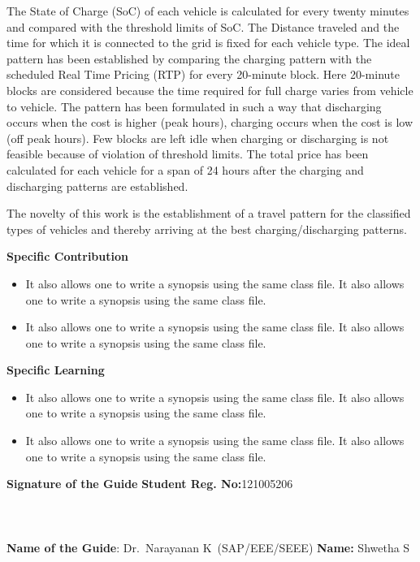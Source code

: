 \documentclass[a4paper, 12pt, oneside]{sastra}
\begin{document}
	The State of Charge (SoC) of each vehicle is calculated for every twenty minutes and compared with the threshold limits of SoC. The Distance traveled and the time for which it is connected to the grid is fixed for each vehicle type. The ideal pattern has been established by comparing the charging pattern with the scheduled Real Time Pricing (RTP) for every 20-minute block. Here 20-minute blocks are considered because the time required for full charge varies from vehicle to vehicle. The pattern has been formulated in such a way that discharging occurs when the cost is higher (peak hours), charging occurs when the cost is low (off peak hours). Few blocks are left idle when charging or discharging is not feasible because of violation of threshold limits. The total price has been calculated for each vehicle for a span of 24 hours after the charging and discharging patterns are established.
	
	The novelty of this work is the establishment of a travel pattern for the classified types of vehicles and thereby arriving at the best charging/discharging patterns.
	
	\noindent \textbf{Specific Contribution}
	\begin{itemize}
		\item It also allows one to write a synopsis using the same class file. It also allows one to write a synopsis using the same class file.
		\item It also allows one to write a synopsis using the same class file. It also allows one to write a synopsis using the same class file.
	\end{itemize}
	\noindent \textbf{Specific Learning}
	\begin{itemize}
		\item It also allows one to write a synopsis using the same class file. It also allows one to write a synopsis using the same class file.
		\item It also allows one to write a synopsis using the same class file. It also allows one to write a synopsis using the same class file.
	\end{itemize}
	
	\vspace*{24pt}
	
	\noindent \textbf{Signature of the Guide} \hspace*{66mm} \textbf{Student Reg. No:}121005206\\
		\\
	\\
	\\
\noindent \textbf{Name of the Guide}:{ Dr.~Narayanan K}~(SAP/EEE/SEEE) \hspace*{10 mm} \textbf{Name:} Shwetha S
\pagebreak
	
\end{document}
